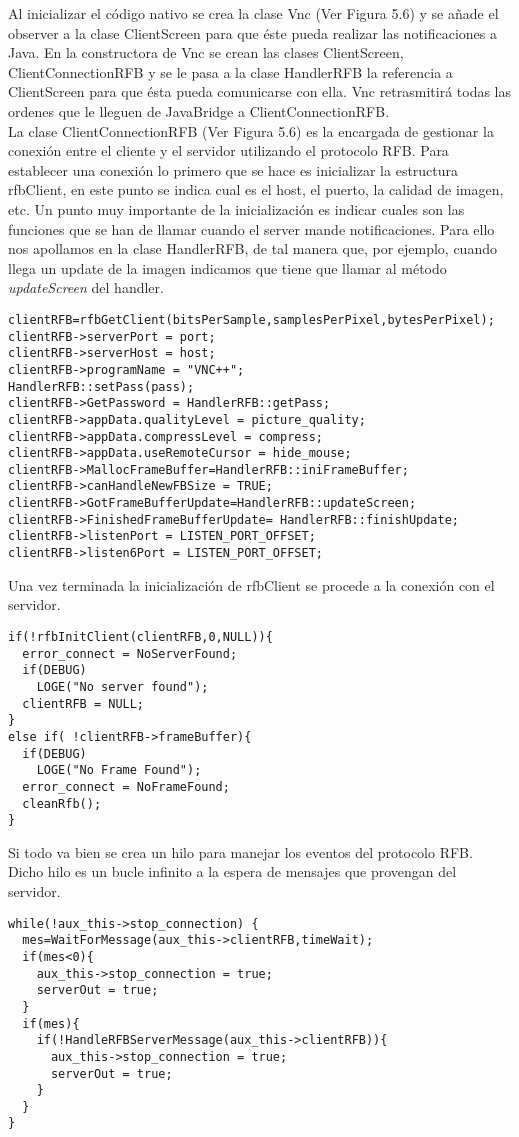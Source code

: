 Al inicializar el código nativo se crea la clase Vnc (Ver Figura 5.6) y se añade el observer a la clase ClientScreen para que éste pueda realizar las notificaciones a Java. En la constructora de Vnc se crean las clases ClientScreen, ClientConnectionRFB y se le pasa a la clase HandlerRFB la referencia a ClientScreen para que ésta pueda comunicarse con ella. Vnc retrasmitirá todas las ordenes que le lleguen de JavaBridge a ClientConnectionRFB.\\

La clase ClientConnectionRFB (Ver Figura 5.6) es la encargada de gestionar la conexión entre el cliente y el servidor utilizando el protocolo RFB. Para establecer una conexión lo primero que se hace es inicializar la estructura rfbClient, en este punto se indica cual es el host, el puerto, la calidad de imagen, etc. Un punto muy importante de la inicialización es indicar cuales son las funciones que se han de llamar cuando el server mande notificaciones. Para ello nos apollamos en la clase HandlerRFB, de tal manera que, por ejemplo, cuando llega un update de la imagen indicamos que tiene que llamar al método \emph{updateScreen} del handler.
\begin{lstlisting}
clientRFB=rfbGetClient(bitsPerSample,samplesPerPixel,bytesPerPixel);
clientRFB->serverPort = port;
clientRFB->serverHost = host;
clientRFB->programName = "VNC++";
HandlerRFB::setPass(pass);
clientRFB->GetPassword = HandlerRFB::getPass;
clientRFB->appData.qualityLevel = picture_quality;
clientRFB->appData.compressLevel = compress;
clientRFB->appData.useRemoteCursor = hide_mouse;
clientRFB->MallocFrameBuffer=HandlerRFB::iniFrameBuffer;
clientRFB->canHandleNewFBSize = TRUE;
clientRFB->GotFrameBufferUpdate=HandlerRFB::updateScreen;
clientRFB->FinishedFrameBufferUpdate= HandlerRFB::finishUpdate;
clientRFB->listenPort = LISTEN_PORT_OFFSET;
clientRFB->listen6Port = LISTEN_PORT_OFFSET;
\end{lstlisting}

Una vez terminada la inicialización de rfbClient se procede a la conexión con el servidor.
\begin{lstlisting}
if(!rfbInitClient(clientRFB,0,NULL)){
  error_connect = NoServerFound;
  if(DEBUG)
    LOGE("No server found");
  clientRFB = NULL;
}
else if( !clientRFB->frameBuffer){
  if(DEBUG)
    LOGE("No Frame Found");
  error_connect = NoFrameFound;
  cleanRfb();
}
\end{lstlisting}

Si todo va bien se crea un hilo para manejar los eventos del protocolo RFB. Dicho hilo es un bucle infinito a la espera de mensajes que provengan del servidor.
\begin{lstlisting}
while(!aux_this->stop_connection) {
  mes=WaitForMessage(aux_this->clientRFB,timeWait);
  if(mes<0){
    aux_this->stop_connection = true;
    serverOut = true;
  }
  if(mes){
    if(!HandleRFBServerMessage(aux_this->clientRFB)){
      aux_this->stop_connection = true;
      serverOut = true;
    }
  }
}
\end{lstlisting}

